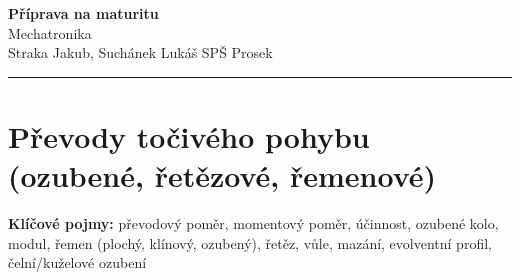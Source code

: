 \documentclass[a4paper,10pt]{article}
\begin{document}
\begin{minipage}[t]{0.75\textwidth}
    {\Huge\bfseries\color{accent} Příprava na maturitu}\\[4pt]
    {\large\color{stripeblue} Mechatronika}\\[2pt]
    \textcolor{medgray}{\small Straka Jakub, Suchánek Lukáš \quad SPŠ Prosek }
\end{minipage}
\hfill
\begin{minipage}[t]{0.22\textwidth}
    \raggedleft
\end{minipage}

\vspace{6pt}
\noindent\color{accent}\rule{\linewidth}{1.5pt}
\vspace{2pt}

\section{Převody točivého pohybu (ozubené, řetězové, řemenové)}

\begin{pojmybox}
\textbf{Klíčové pojmy:}
převodový poměr, momentový poměr, účinnost, ozubené kolo,
modul, řemen (plochý, klínový, ozubený), řetěz,
vůle, mazání, evolventní profil, čelní/kuželové ozubení
\end{pojmybox}
\end{document}
